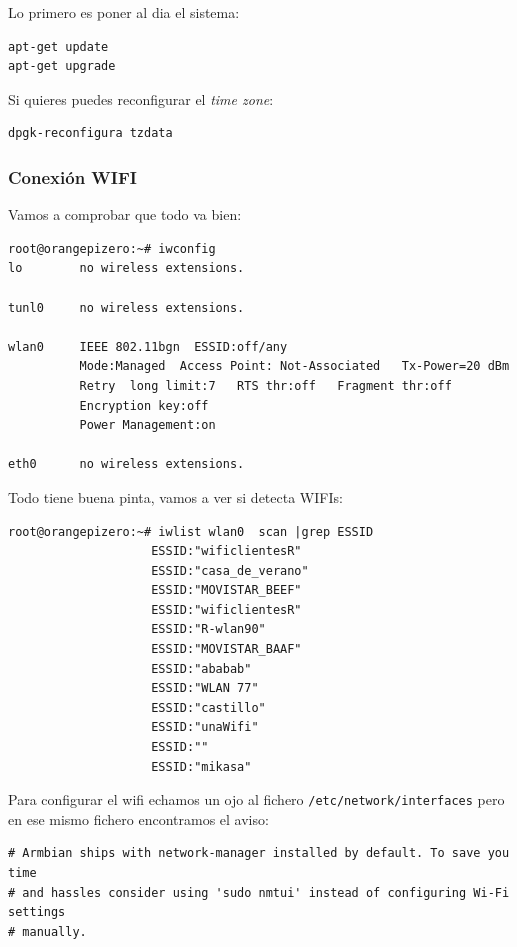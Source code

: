 \documentclass[12pt,spanish,]{article}
\begin{document}
Lo primero es poner al dia el sistema:

\begin{verbatim}
apt-get update
apt-get upgrade
\end{verbatim}

Si quieres puedes reconfigurar el \emph{time zone}:

\begin{verbatim}
dpgk-reconfigura tzdata
\end{verbatim}

\subsubsection{Conexión WIFI}\label{conexiuxf3n-wifi}

Vamos a comprobar que todo va bien:

\begin{verbatim}
root@orangepizero:~# iwconfig
lo        no wireless extensions.

tunl0     no wireless extensions.

wlan0     IEEE 802.11bgn  ESSID:off/any
          Mode:Managed  Access Point: Not-Associated   Tx-Power=20 dBm
          Retry  long limit:7   RTS thr:off   Fragment thr:off
          Encryption key:off
          Power Management:on

eth0      no wireless extensions.
\end{verbatim}

Todo tiene buena pinta, vamos a ver si detecta WIFIs:

\begin{verbatim}
root@orangepizero:~# iwlist wlan0  scan |grep ESSID
                    ESSID:"wificlientesR"
                    ESSID:"casa_de_verano"
                    ESSID:"MOVISTAR_BEEF"
                    ESSID:"wificlientesR"
                    ESSID:"R-wlan90"
                    ESSID:"MOVISTAR_BAAF"
                    ESSID:"ababab"
                    ESSID:"WLAN 77"
                    ESSID:"castillo"
                    ESSID:"unaWifi"
                    ESSID:""
                    ESSID:"mikasa"
\end{verbatim}

Para configurar el wifi echamos un ojo al fichero
\texttt{/etc/network/interfaces} pero en ese mismo fichero encontramos
el aviso:

\begin{verbatim}
# Armbian ships with network-manager installed by default. To save you time
# and hassles consider using 'sudo nmtui' instead of configuring Wi-Fi settings
# manually.
\end{verbatim}
\end{document}
